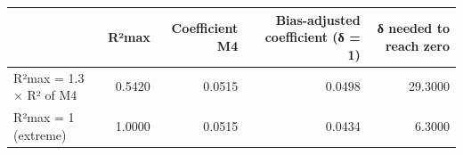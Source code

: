 \begin{tabular}{lrrrr}
\toprule
 & R²max & Coefficient M4 & Bias-adjusted coefficient (δ = 1) & δ needed to reach zero \\
\midrule
R²max = 1.3 × R² of M4 & 0.5420 & 0.0515 & 0.0498 & 29.3000 \\
R²max = 1 (extreme) & 1.0000 & 0.0515 & 0.0434 & 6.3000 \\
\bottomrule
\end{tabular}
